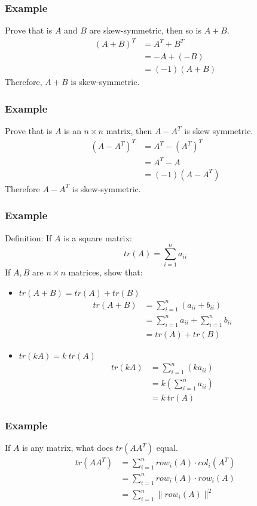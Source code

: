 \documentclass{math}
\begin{document}
\subsubsection*{Example}
Prove that is \( A \) and \( B \) are skew-symmetric, then so is \( A+B \).
\begin{align*}
  (A+B)^T &= A^T+B^T \\
  &= -A+(-B) \\
  &= (-1)(A+B)
\end{align*}
Therefore, \( A+B \) is skew-symmetric.

\subsubsection*{Example}
Prove that is \( A \) is an \( n\times n \) matrix, then \( A-A^T \) is skew
symmetric.
\begin{align*}
  (A-A^T)^T &= A^T-(A^T)^T \\
  &= A^T-A \\
  &= (-1)(A-A^T)
\end{align*}
Therefore \( A-A^T \) is skew-symmetric.

\subsubsection*{Example}
Definition: If \( A \) is a square matrix:
\[ tr(A) = \sum_{i=1}^{n}a_{ii} \]
If \( A,B \) are \( n\times n \) matrices, show that:
\begin{itemize}
  \item \( tr(A+B) = tr(A)+tr(B) \)
  \begin{align*}
    tr(A+B) &= \sum_{i=1}^{n}(a_{ii}+b_{ii}) \\
    &= \sum_{i=1}^{n}a_{ii}+\sum_{i=1}^{n}b_{ii} \\
    &= tr(A)+tr(B)
  \end{align*}
  \item \( tr(kA) = k~tr(A) \)
  \begin{align*}
    tr(kA) &= \sum_{i=1}^{n}(ka_{ii}) \\
    &= k\left(\sum_{i=1}^{n}a_{ii}\right) \\
    &= k~tr(A)
  \end{align*}
\end{itemize}

\subsubsection*{Example}
If \( A \) is any matrix, what does \( tr(AA^T) \) equal.
\begin{align*}
  tr(AA^T) &= \sum_{i=1}^{n}row_i(A)\cdot col_i(A^T) \\
  &= \sum_{i=1}^{n}row_i(A)\cdot row_i(A) \\
  &= \sum_{i=1}^{n}\|row_i(A)\|^2
\end{align*}
\end{document}
